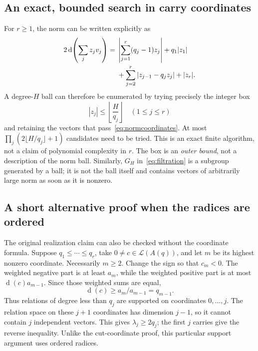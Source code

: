 \documentclass[11pt]{article}
\numberwithin{equation}{section}
\theoremstyle{definition}
\theoremstyle{remark}\newtheorem{remark}[theorem]{Remark}
\newcommand{\Latt}{\mathcal L}
\newcommand{\dgr}{\operatorname{d}}
\begin{document}
\subsection{An exact, bounded search in carry coordinates}

For $r\ge1$, the norm can be written explicitly as
\begin{align}\label{eq:normcoordinates}
 2\dgr\!\left(\sum_jz_jv_j\right)
  ={}&\left|\sum_{j=1}^r(q_j-1)z_j\right|+q_1|z_1|\notag\\
     &+\sum_{j=2}^r|z_{j-1}-q_jz_j|+|z_r|.
\end{align}
A degree-$H$ ball can therefore be enumerated by trying precisely the
integer box
\begin{equation}\label{eq:box}
 |z_j|\le\left\lfloor\frac{H}{q_j}\right\rfloor
 \quad(1\le j\le r)
\end{equation}
and retaining the vectors that pass~\eqref{eq:normcoordinates}.
At most
$\prod_j(2\lfloor H/q_j\rfloor+1)$ candidates need to be tried.
This is an exact finite algorithm, not a claim of polynomial complexity in
$r$.  The box is an \emph{outer bound}, not a description of the norm ball.
Similarly, $G_H$ in~\eqref{eq:filtration} is a subgroup generated by a ball;
it is not the ball itself and contains vectors of arbitrarily large norm
as soon as it is nonzero.

\subsection{A short alternative proof when the radices are ordered}

The original realization claim can also be checked without the coordinate
formula.  Suppose $q_1\le\cdots\le q_r$, take $0\ne c\in\Latt(A(q))$,
and let $m$ be its highest nonzero coordinate.  Necessarily $m\ge2$.
Change the sign so that $c_m<0$.  The weighted negative part is at least
$a_m$, while the weighted positive part is at most
$\dgr(c)a_{m-1}$.  Since those weighted sums are equal,
\begin{equation}\label{eq:highest}
 \dgr(c)\ge a_m/a_{m-1}=q_{m-1}.
\end{equation}
Thus relations of degree less than $q_j$ are supported on coordinates
$0,\ldots,j$.  The relation space on these $j+1$ coordinates has dimension
$j-1$, so it cannot contain $j$ independent vectors.  This gives
$\lambda_j\ge2q_j$; the first $j$ carries give the reverse inequality.
Unlike the cut-coordinate proof, this particular support argument uses
ordered radices.
\end{document}
